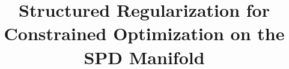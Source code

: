 \documentclass[sn-nature]{sn-jnl}%
\theoremstyle{thmstyleone}%
\theoremstyle{thmstyletwo}%
\theoremstyle{thmstylethree}%
\begin{document}
\title[Article Title]{ Structured Regularization for Constrained Optimization on the SPD Manifold}


\author[1]{ }
\author[1]{ }










\end{document}
